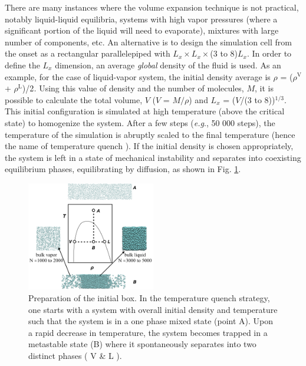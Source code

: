 \documentclass[9pt,tutorial]{livecoms}
\begin{document}
There are many instances where the volume expansion technique is not practical,
notably liquid-liquid equilibria, systems with high vapor pressures (where
a significant portion of the liquid will need to evaporate), mixtures with
large number of components, etc.  An alternative is to design the simulation
cell from the onset as a rectangular parallelepiped with $L_{x} \times L_{x} \times$(3 to 8)$L_{x}$. In order to define the
$L_{x}$ dimension, an average \textit{global} density of the fluid is
used. As an example, for the case of liquid-vapor system, the initial density
average is ${\rho}$ = (${\rho}^{\mathrm{V}}$
+ ${\rho}^{\mathrm{L}}$)/2\textit{.} Using this value of density and the
number of molecules, $M$, it is possible to calculate the total volume,
$V$ ($V$ = $M/\rho$) and $L_{x}$
= ($V$/(3 to 8))$^{\mathrm{1/3}}$. This initial configuration is
simulated at high temperature (above the critical state) to homogenize the
system. After a few steps (\textit{e.g}., 50 000 steps), the temperature of the
simulation is abruptly scaled to the final temperature (hence the name of
temperature quench \citep{martinez2005}).  If the initial
density is chosen appropriately, the system is left in a state of mechanical
instability and separates into coexisting equilibrium phases, equilibrating by
diffusion, as shown in Fig. \ref{fig:6b}.

\begin{figure}
  \includegraphics[width=0.5\textwidth]{gfx/image19.png}
  \caption{Preparation of the initial box. In the temperature quench strategy, one starts with a system with overall initial density and temperature such that the system is in a one phase mixed state (point A). Upon a rapid decrease in temperature, the system becomes trapped in a metastable state (B) where it spontaneously separates into two distinct phases ( V \& L ). }
  \label{fig:6b}
\end{figure}
\end{document}
